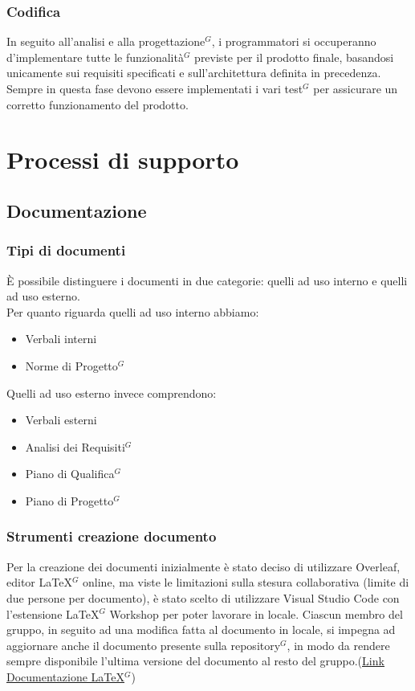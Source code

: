 \documentclass[a4paper,10pt]{article}
\begin{document}
\subsubsection{Codifica}
In seguito all'analisi e alla progettazione$^G$, i programmatori si occuperanno d'implementare tutte le funzionalità$^G$ 
previste per il prodotto finale, basandosi unicamente sui requisiti specificati e sull'architettura definita in precedenza. 
Sempre in questa fase devono essere implementati i vari test$^G$ per assicurare un corretto funzionamento del prodotto.

\section{Processi di supporto}
\subsection{Documentazione}
\subsubsection{Tipi di documenti}
È possibile distinguere i documenti in due categorie: quelli ad uso interno e quelli ad uso esterno. \\
Per quanto riguarda quelli ad uso interno abbiamo:
\begin{itemize}
  \item Verbali interni 
  \item Norme di Progetto$^G$
\end{itemize}
Quelli ad uso esterno invece comprendono:
\begin{itemize}
  \item Verbali esterni
  \item Analisi dei Requisiti$^G$
  \item Piano di Qualifica$^G$
  \item Piano di Progetto$^G$
\end{itemize}
\subsubsection{Strumenti creazione documento}
Per la creazione dei documenti inizialmente è stato deciso di utilizzare Overleaf, editor LaTeX$^G$ online, ma viste le limitazioni
sulla stesura collaborativa (limite di due persone per documento), è stato scelto di utilizzare Visual Studio Code con l'estensione
LaTeX$^G$ Workshop per poter lavorare in locale. Ciascun membro del gruppo, in seguito ad una modifica fatta al documento in locale,
si impegna ad aggiornare anche il documento presente sulla repository$^G$, in modo da rendere sempre disponibile l'ultima versione
del documento al resto del gruppo.(\href{https://www.latex-project.org/help/documentation/}{\underline{Link Documentazione LaTeX$^G$}})
\end{document}
